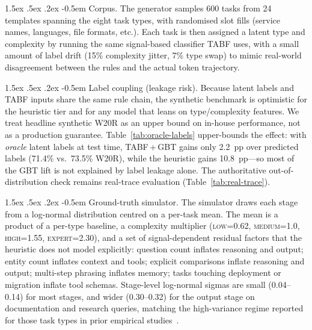 \documentclass{article}
\makeatletter
\renewcommand\paragraph{%
  \@startsection{paragraph}{4}{\z@}%
    {1.5ex \@plus.5ex \@minus.2ex}%
    {-0.5em}%
    {\normalfont\normalsize\bfseries}%
}
\makeatother
\begin{document}
\paragraph{Corpus.}
The generator samples 600 tasks from 24 templates spanning the eight
task types, with randomised slot fills (service names, languages, file
formats, etc.). Each task is then assigned a latent type and complexity
by running the same signal-based classifier TABF uses, with a small
amount of label drift (15\% complexity jitter, 7\% type swap) to mimic
real-world disagreement between the rules and the actual token
trajectory.

\paragraph{Label coupling (leakage risk).}
Because latent labels and TABF inputs share the same rule chain, the
synthetic benchmark is optimistic for the heuristic tier and for any model
that leans on type/complexity features. We treat headline synthetic W20R
as an upper bound on in-house performance, not as a production guarantee.
Table~\ref{tab:oracle-labels} upper-bounds the effect: with \emph{oracle}
latent labels at test time, TABF\,+\,GBT gains only 2.2~pp over predicted
labels (71.4\% vs.\ 73.5\% W20R), while the heuristic gains 10.8~pp---so
most of the GBT lift is not explained by label leakage alone. The
authoritative out-of-distribution check remains real-trace evaluation
(Table~\ref{tab:real-trace}).

\paragraph{Ground-truth simulator.}
The simulator draws each stage from a log-normal distribution centred on
a per-task mean. The mean is a product of a per-type baseline, a
complexity multiplier (\textsc{low}{=}0.62, \textsc{medium}{=}1.0,
\textsc{high}{=}1.55, \textsc{expert}{=}2.30), and a set of
signal-dependent residual factors that the heuristic does not model
explicitly: question count inflates reasoning and output; entity count
inflates context and tools; explicit comparisons inflate reasoning and
output; multi-step phrasing inflates memory; tasks touching deployment
or migration inflate tool schemas. Stage-level log-normal sigmas are
small (0.04--0.14) for most stages, and wider (0.30--0.32) for the
output stage on documentation and research queries, matching the
high-variance regime reported for those task types in prior empirical
studies~\citep{salim2025}.
\end{document}
